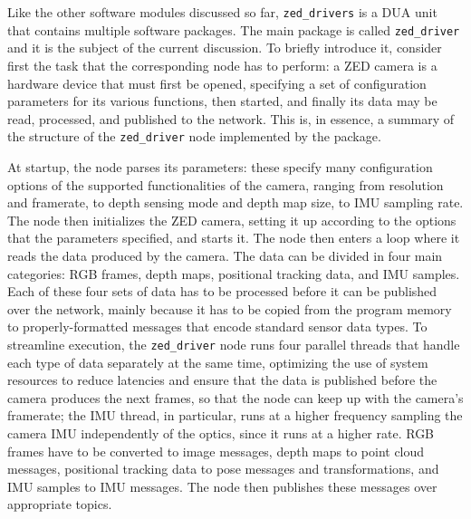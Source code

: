 Like the other software modules discussed so far, \texttt{zed\_drivers} is a DUA unit that contains multiple \ROS software packages. The main package is called \texttt{zed\_driver} and it is the subject of the current discussion. To briefly introduce it, consider first the task that the corresponding node has to perform: a ZED camera is a hardware device that must first be opened, specifying a set of configuration parameters for its various functions, then started, and finally its data may be read, processed, and published to the \ROS network. This is, in essence, a summary of the structure of the \texttt{zed\_driver} node implemented by the package.

At startup, the \ROS node parses its parameters: these specify many configuration options of the supported functionalities of the camera, ranging from resolution and framerate, to depth sensing mode and depth map size, to IMU sampling rate. The node then initializes the ZED camera, setting it up according to the options that the parameters specified, and starts it. The node then enters a loop where it reads the data produced by the camera. The data can be divided in four main categories: RGB frames, depth maps, positional tracking data, and IMU samples. Each of these four sets of data has to be processed before it can be published over the \ROS network, mainly because it has to be copied from the program memory to properly-formatted \ROS messages that encode standard sensor data types. To streamline execution, the \texttt{zed\_driver} node runs four parallel threads that handle each type of data separately at the same time, optimizing the use of system resources to reduce latencies and ensure that the data is published before the camera produces the next frames, so that the node can keep up with the camera's framerate; the IMU thread, in particular, runs at a higher frequency sampling the camera IMU independently of the optics, since it runs at a higher rate. RGB frames have to be converted to \ROS image messages, depth maps to point cloud messages, positional tracking data to pose messages and transformations, and IMU samples to IMU messages. The node then publishes these messages over appropriate topics.

